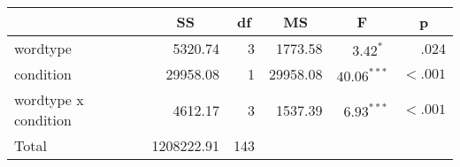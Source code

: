 \begin{center}
\begin{tabular}{lrrrrr}
\toprule
 & \multicolumn{1}{c}{\textbf{SS}} & \multicolumn{1}{c}{\textbf{df}} & \multicolumn{1}{c}{\textbf{MS}} & \multicolumn{1}{c}{\textbf{F}} & \multicolumn{1}{c}{\textbf{p}} \\
\midrule
wordtype & 5320.74 & 3 & 1773.58 & $3.42^{*  \ \ }$ & .024 \\
condition & 29958.08 & 1 & 29958.08 & $40.06^{***}$ & $< .001$ \\
wordtype x condition & 4612.17 & 3 & 1537.39 & $6.93^{***}$ & $< .001$ \\
\midrule
Total & 1208222.91 & 143 \\
\bottomrule
\end{tabular}
\end{center}